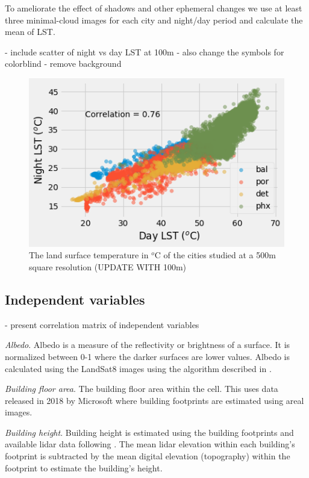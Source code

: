 \documentclass[]{elsarticle}
\begin{document}
To ameliorate the effect of shadows and other ephemeral changes we use at least three minimal-cloud images for each city and night/day period and calculate the mean of LST.

- include scatter of night vs day LST at 100m - also change the symbols for colorblind - remove background
\begin{figure}[h]
\begin{center}
\includegraphics[width=\textwidth]{fig/report/lst_night-vs-day.png}
\caption{The land surface temperature in $^o$C of the cities studied at a 500m square resolution (UPDATE WITH 100m)}
\label{fig:scatter_lst}
\end{center}
\end{figure}
\subsection{Independent variables}
- present correlation matrix of independent variables

\textit{Albedo}. Albedo is a measure of the reflectivity or brightness of a surface. It is normalized between 0-1 where the darker surfaces are lower values. Albedo is calculated using the LandSat8 images using the algorithm described in \cite{Smith2010-nw, Liang2001-jd}. 

\textit{Building floor area}. The building floor area within the cell. This uses data released in 2018 by Microsoft where building footprints are estimated using areal images. 

\textit{Building height}. Building height is estimated using the building footprints and available lidar data following \cite{Chun2017-mm}. The mean lidar elevation within each building's footprint is subtracted by the mean digital elevation (topography) within the footprint to estimate the building's height.
\end{document}
